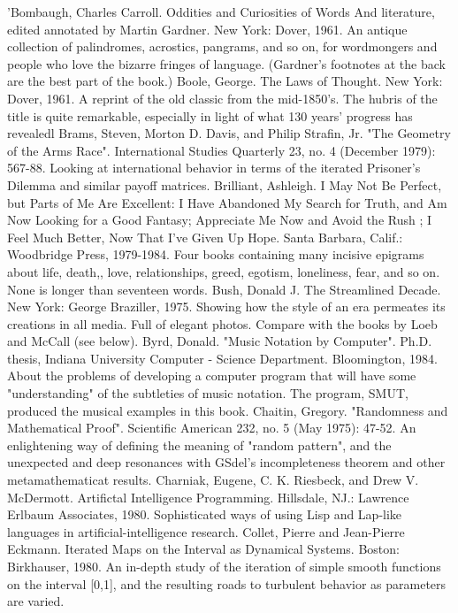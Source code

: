 'Bombaugh, Charles Carroll. Oddities and Curiosities of Words And literature, edited
  annotated by Martin Gardner. New York: Dover, 1961. An antique collection of
  palindromes, acrostics, pangrams, and so on, for wordmongers and people who love the
  bizarre fringes of language. (Gardner's footnotes at the back are the best part of the book.)
Boole, George. The Laws of Thought. New York: Dover, 1961. A reprint of the old classic
  from the mid-1850's. The hubris of the title is quite remarkable, especially in light of what
  130 years' progress has revealedl
Brams, Steven, Morton D. Davis, and Philip Strafin, Jr. "The Geometry of the Arms Race".
  International Studies Quarterly 23, no. 4 (December 1979): 567-88. Looking at international
  behavior in terms of the iterated Prisoner's Dilemma and similar payoff matrices.
Brilliant, Ashleigh. I May Not Be Perfect, but Parts of Me Are Excellent: I Have Abandoned
  My Search for Truth, and Am Now Looking for a Good Fantasy; Appreciate Me Now and
  Avoid the Rush ; I Feel Much Better, Now That I've Given Up Hope. Santa Barbara, Calif.:
  Woodbridge Press, 1979-1984. Four books containing many incisive epigrams about life,
  death,, love, relationships, greed, egotism, loneliness, fear, and so on. None is longer than
  seventeen words.
Bush, Donald J. The Streamlined Decade. New York: George Braziller, 1975. Showing how
  the style of an era permeates its creations in all media. Full of elegant photos. Compare with
  the books by Loeb and McCall (see below).
Byrd, Donald. "Music Notation by Computer". Ph.D. thesis, Indiana University Computer -
  Science Department. Bloomington, 1984. About the problems of developing a computer
  program that will have some "understanding" of the subtleties of music notation. The
  program, SMUT, produced the musical examples in this book.
Chaitin, Gregory. "Randomness and Mathematical Proof". Scientific American 232, no. 5
  (May 1975): 47-52. An enlightening way of defining the meaning of "random pattern", and
  the unexpected and deep resonances with GSdel's incompleteness theorem and other
  metamathematicat results.
Charniak, Eugene, C. K. Riesbeck, and Drew V. McDermott. Artifictal Intelligence
  Programming. Hillsdale, NJ.: Lawrence Erlbaum Associates, 1980. Sophisticated ways of
  using Lisp and Lap-like languages in artificial-intelligence research.
Collet, Pierre and Jean-Pierre Eckmann. Iterated Maps on the Interval as Dynamical Systems.
  Boston: Birkhauser, 1980. An in-depth study of the iteration of simple smooth functions on
  the interval [0,1], and the resulting roads to turbulent behavior as parameters are varied.
